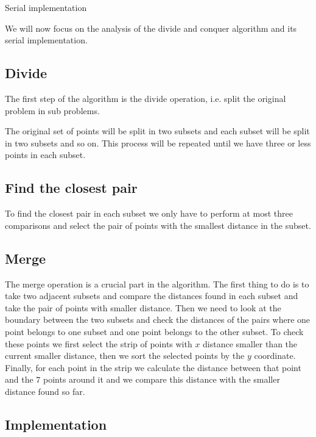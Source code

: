 Serial implementation

We will now focus on the analysis of the divide and conquer algorithm 
and its serial implementation.

\subsection{Divide}
The first step of the algorithm is the divide operation, i.e.
split the original problem in sub problems. 

The original set of points will be split in two subsets and each
subset will be split in two subsets and so on. This process will be repeated
until we have three or less points in each subset.
\subsection{Find the closest pair}
To find the closest pair in each subset we only have to perform
at most three comparisons and select the pair of points with the smallest
distance in the subset.
\subsection{Merge}
The merge operation is a crucial part in the algorithm.
The first thing to do is to take two adjacent subsets and compare the distances
found in each subset and take the pair of points with smaller distance. Then we 
need to look at the boundary between the two subsets and check the distances of 
the pairs where one point belongs to one subset and one point belongs to the other
subset. To check these points we first select the strip of points with $x$ distance smaller
than the current smaller distance, then we sort the selected points by the $y$ coordinate.
Finally, for each point in the strip we calculate the distance between that point and 
the $7$ points around it and we compare this distance with the smaller distance found so far.


\subsection{Implementation}
